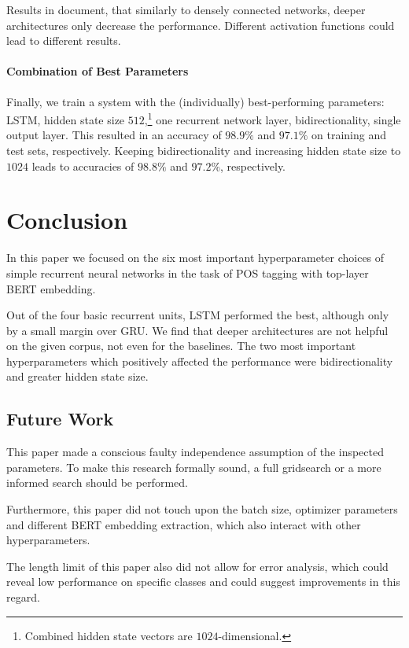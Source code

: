 \documentclass[11pt,a4paper]{article}
\begin{document}
Results in  document, that similarly to densely connected networks, deeper architectures only decrease the performance. Different activation functions could lead to different results.

\paragraph{Combination of Best Parameters}

Finally, we train a system with the (individually) best-performing parameters: LSTM, hidden state size $512$,\footnote{Combined hidden state vectors are $1024$-dimensional.} one recurrent network layer, bidirectionality, single output layer. This resulted in an accuracy of $98.9\%$ and $97.1\%$ on training and test sets, respectively. Keeping bidirectionality and increasing hidden state size to $1024$ leads to accuracies of $98.8\%$ and $97.2\%$, respectively.

\section{Conclusion}

In this paper we focused on the six most important hyperparameter choices of simple recurrent neural networks in the task of POS tagging with top-layer BERT embedding.

Out of the four basic recurrent units, LSTM performed the best, although only by a small margin over GRU. We find that deeper architectures are not helpful on the given corpus, not even for the baselines. The two most important hyperparameters which positively affected the performance were bidirectionality and greater hidden state size.

\subsection{Future Work}

This paper made a conscious faulty independence assumption of the inspected parameters. To make this research formally sound, a full gridsearch or a more informed search should be performed.

Furthermore, this paper did not touch upon the batch size, optimizer parameters and different BERT embedding extraction, which also interact with other hyperparameters.

The length limit of this paper also did not allow for error analysis, which could reveal low performance on specific classes and could suggest improvements in this regard.




\end{document}
